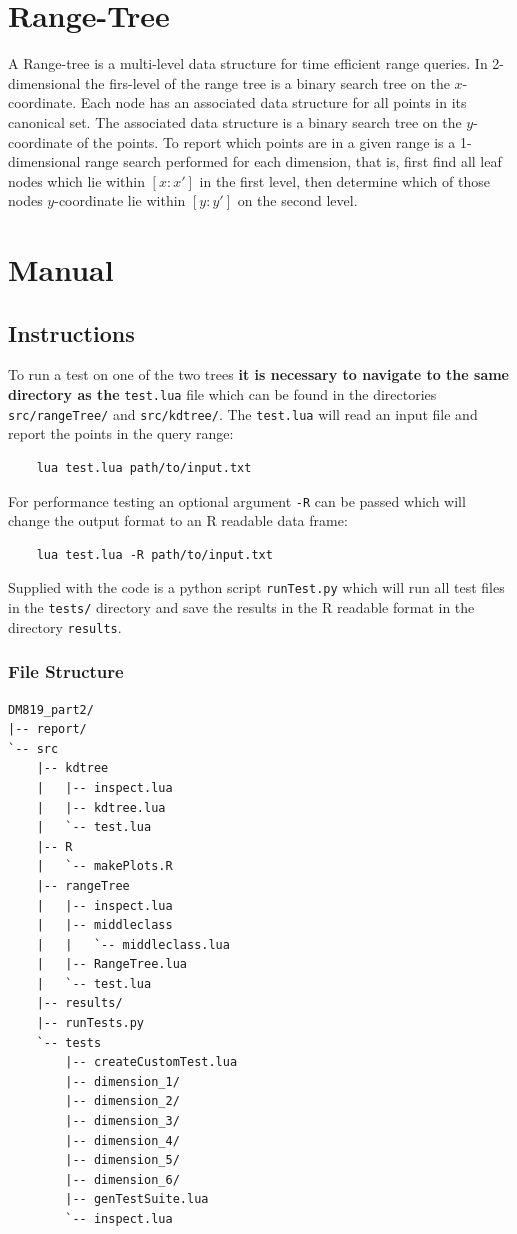 \documentclass{article}
\begin{document}
\section{Range-Tree}
  A Range-tree is a multi-level data structure for time efficient range queries.
  In 2-dimensional the firs-level of the range tree is a binary search tree on 
  the $x$-coordinate. Each node has an associated data structure for all
  points in its canonical set. The associated data structure is a binary 
  search tree on the $y$-coordinate of the points. 
  To report which points are in a given range is a 1-dimensional range search 
  performed for each dimension, that is, first find all leaf nodes which lie 
  within $[x:x']$ in the first level, then determine which of those nodes 
  $y$-coordinate lie within $[y:y']$ on the second level. 
\section{Manual}
  \subsection{Instructions}
  To run a test on one of the two trees \textbf{it is necessary to navigate to 
  the same directory as the} \verb|test.lua| file which can be found in the 
  directories \verb|src/rangeTree/| and \verb|src/kdtree/|.
  The \verb|test.lua| will read an input file and report the points in the query
  range:
  \begin{verbatim}
  	lua test.lua path/to/input.txt
  \end{verbatim}
  For performance testing an optional argument \verb|-R| can be passed which 
  will change the output format to an R readable data frame: 
  \begin{verbatim}
  	lua test.lua -R path/to/input.txt
  \end{verbatim}
  Supplied with the code is a python script \verb|runTest.py| which will run all 
  test files in the \verb|tests/| directory and save the results in the R 
  readable format in the directory \verb|results|.
\subsubsection{File Structure}
\begin{verbatim}
DM819_part2/
|-- report/
`-- src
    |-- kdtree
    |   |-- inspect.lua
    |   |-- kdtree.lua
    |   `-- test.lua
    |-- R
    |   `-- makePlots.R
    |-- rangeTree
    |   |-- inspect.lua
    |   |-- middleclass
    |   |   `-- middleclass.lua
    |   |-- RangeTree.lua
    |   `-- test.lua
    |-- results/
    |-- runTests.py
    `-- tests
        |-- createCustomTest.lua
        |-- dimension_1/
        |-- dimension_2/
        |-- dimension_3/
        |-- dimension_4/
        |-- dimension_5/
        |-- dimension_6/
        |-- genTestSuite.lua
        `-- inspect.lua
\end{verbatim}
  
\end{document}
